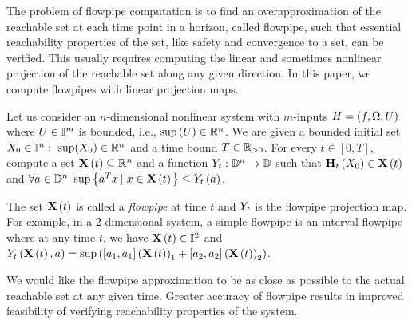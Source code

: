 The problem of flowpipe computation is to find an overapproximation of
the reachable set at each time point in a horizon, called flowpipe,
such that essential reachability properties of the set, like safety
and convergence to a set, can be verified.  This usually requires
computing the linear and sometimes nonlinear projection of the
reachable set along any given direction.  In this paper, we compute
flowpipes with linear projection maps.
%
\begin{problem}
Let us consider an $n$-dimensional nonlinear system with $m$-inputs $H
= \left(f,\Omega,U\right)$ where $U\in\mathbb{I}^m$ is bounded, i.e.,
$\sup\left(U\right)\in\mathbb{R}^n$.  We are given a bounded initial set
$X_0\in\mathbb{I}^n:~\sup(X_0)\in\mathbb{R}^n$ and a time bound
$T\in\mathbb{R}_{> 0}$.  For every $t\in[0,T]$, compute a set
$\mathbf{X}\left(t\right)\subseteq \mathbb{R}^n$ and a function
$Y_{t}:\mathbb{D}^n\rightarrow \mathbb{D}$ such that
$\mathbf{H}_{t}\left(X_0\right)\in\mathbf{X}\left(t\right)$ and $\forall
a\in\mathbb{D}^n~\sup\left\{a^Tx\left|~x\in\mathbf{X}\left(t\right)\right.\right\}\leq
Y_{t}\left(a\right)$.
\end{problem}
%
The set $\mathbf{X}\left(t\right)$ is called a 
\emph{flowpipe} at time $t$ and $Y_{t}$ is the flowpipe projection map.
For example, in a $2$-dimensional system, a simple flowpipe is an interval flowpipe where at any time $t$, we have
$\mathbf{X}\left(t\right)\in\mathbb{I}^2$ and $Y_{t}\left(\mathbf{X}\left(t\right),a\right) =
\sup\left([a_1,a_1]\left(\mathbf{X}\left(t\right)\right)_1 + [a_2,a_2]\left(\mathbf{X}\left(t\right)\right)_2\right)$.

We would like the flowpipe approximation to be as close as possible to
the actual reachable set at any given time.  Greater accuracy of flowpipe results in
improved feasibility of verifying reachability properties of the
system.
